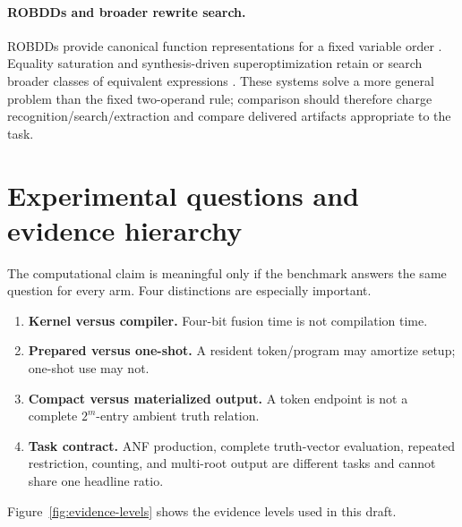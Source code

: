 \documentclass[10pt]{article}
\theoremstyle{plain}
\theoremstyle{definition}
\theoremstyle{remark}
\begin{document}
\paragraph{ROBDDs and broader rewrite search.}
ROBDDs provide canonical function representations for a fixed variable order \cite{Bryant1986}. Equality saturation and synthesis-driven superoptimization retain or search broader classes of equivalent expressions \cite{Willsey2021,Sasnauskas2017}. These systems solve a more general problem than the fixed two-operand rule; comparison should therefore charge recognition/search/extraction and compare delivered artifacts appropriate to the task.

\section{Experimental questions and evidence hierarchy}
\label{sec:evaluation}

The computational claim is meaningful only if the benchmark answers the same question for every arm. Four distinctions are especially important.

\begin{enumerate}
 \item \textbf{Kernel versus compiler.} Four-bit fusion time is not compilation time.
 \item \textbf{Prepared versus one-shot.} A resident token/program may amortize setup; one-shot use may not.
 \item \textbf{Compact versus materialized output.} A token endpoint is not a complete $2^m$-entry ambient truth relation.
 \item \textbf{Task contract.} ANF production, complete truth-vector evaluation, repeated restriction, counting, and multi-root output are different tasks and cannot share one headline ratio.
\end{enumerate}

Figure~\ref{fig:evidence-levels} shows the evidence levels used in this draft.
\end{document}
